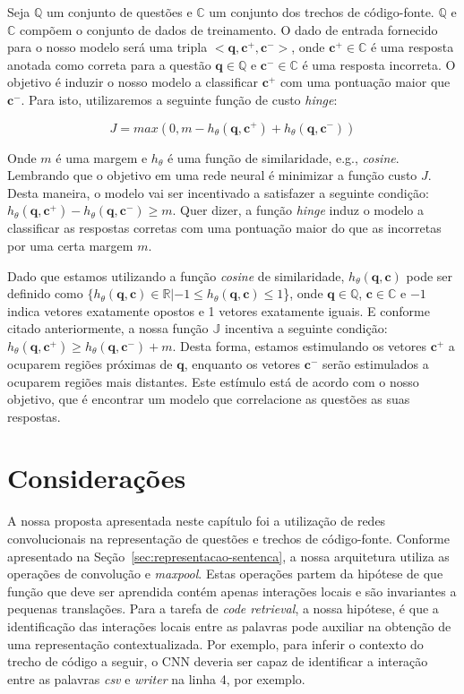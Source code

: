 Seja $\mathbb{Q}$ um conjunto de questões e $\mathbb{C}$ um conjunto dos trechos de código-fonte. $\mathbb{Q}$ e $\mathbb{C}$ compõem o conjunto de dados de treinamento. O dado de entrada fornecido para o nosso modelo será uma tripla $<\bm{q}, \bm{c^{+}}, \bm{c^{-}}>$, onde $\bm{c^{+}} \in \mathbb{C}$ é uma resposta anotada como correta para a questão $\bm{q} \in \mathbb{Q}$ e $\bm{c^{-}} \in \mathbb{C}$ é uma resposta incorreta. O objetivo é induzir o nosso modelo a classificar $\bm{c^{+}}$ com uma pontuação maior que $\bm{c^{-}}$. Para isto, utilizaremos a seguinte função de custo \textit{hinge}:

\begin{equation}
J = max(0, m - h_{\theta}(\bm{q}, \bm{c^{+}}) + h_{\theta}(\bm{q}, \bm{c^{-}}))
\end{equation}

Onde $m$ é uma margem e $h_{\theta}$ é uma função de similaridade, e.g., \textit{cosine}. Lembrando que o objetivo em uma rede neural é minimizar a função custo $J$. Desta maneira, o modelo vai ser incentivado a satisfazer a seguinte condição: $h_{\theta}(\bm{q}, \bm{c^{+}}) - h_{\theta}(\bm{q}, \bm{c^{-}}) \geq m$. Quer dizer, a função \textit{hinge} induz o modelo a classificar as respostas corretas com uma pontuação maior do que as incorretas por uma certa margem $m$. 

Dado que estamos utilizando a função \textit{cosine} de similaridade, $h_{\theta}(\bm{q}, \bm{c})$ pode ser definido como $\{h_{\theta}(\bm{q}, \bm{c}) \in \mathbb{R} | -1 \leq h_{\theta}(\bm{q}, \bm{c}) \leq 1$\}, onde $\bm{q} \in \mathbb{Q}$, $\bm{c} \in \mathbb{C}$ e $-1$ indica vetores exatamente opostos e 1 vetores exatamente iguais. E conforme citado anteriormente, a nossa função $\mathbb{J}$ incentiva a seguinte condição: $h_{\theta}(\bm{q}, \bm{c^{+}}) \geq h_{\theta}(\bm{q}, \bm{c^{-}}) + m$. Desta forma, estamos estimulando os vetores $\bm{c^{+}}$ a ocuparem regiões próximas de $\bm{q}$, enquanto os vetores $\bm{c^{-}}$ serão estimulados a ocuparem regiões mais distantes. Este estímulo está de acordo com o nosso objetivo, que é encontrar um modelo que correlacione as questões as suas respostas.


\section{Considerações}

A nossa proposta apresentada neste capítulo foi a utilização de redes convolucionais na representação de questões e trechos de código-fonte. Conforme apresentado na Seção~\ref{sec:representacao-sentenca}, a nossa arquitetura utiliza as operações de convolução e \textit{maxpool}. Estas operações partem da hipótese de que função que deve ser aprendida contém apenas interações locais e são invariantes a pequenas translações. Para a tarefa de \textit{code retrieval}, a nossa hipótese, é que a identificação das interações locais entre as palavras pode auxiliar na obtenção de uma representação contextualizada. Por exemplo, para inferir o contexto do trecho de código a seguir, o CNN deveria ser capaz de identificar a interação entre as palavras \emph{csv} e \emph{writer} na linha 4, por exemplo. 

